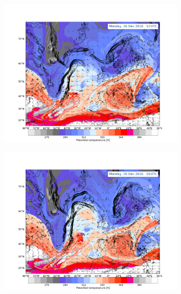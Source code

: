 \begin{figure}\ContinuedFloat
	\centering
	\begin{subfigure}[b]{0.49\textwidth}
		\includegraphics[trim={4.2cm 0cm 4.3cm 5.1cm},clip,
		width=\textwidth]{./fig_DynTropo/20161226_12}
		\caption{} \label{fig:DT26}
	\end{subfigure}
	\begin{subfigure}[b]{0.49\textwidth}
		\includegraphics[trim={4.2cm 0cm 4.3cm 5.1cm},clip,
		width=\textwidth]{./fig_DynTropo/20161226_18}
		\caption{} \label{fig:DT26_18}
	\end{subfigure}

\end{figure}
